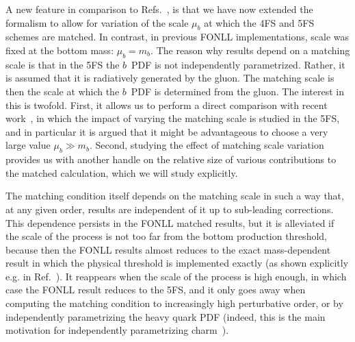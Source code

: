 \documentclass[12pt]{article}
\begin{document}
A new feature  in comparison to
Refs.~\cite{Forte:2015hba,Forte:2016sja},
is that we have now extended the formalism to allow for variation of
the scale $\mu_b$ at which the 4FS and 5FS schemes are matched.
In contrast,  in previous FONLL implementations, scale was fixed at
the  bottom mass:  $\mu_b=m_b$.
The reason why results depend on a matching scale is that in 
the 5FS the $b$~PDF is not independently
parametrized. Rather, it is assumed that it is radiatively generated
by the gluon. The matching scale is then the scale at which the $b$~PDF
is determined from the gluon. 
The interest in this is twofold. First,  it allows us
to perform  a direct comparison with recent work~\cite{Bertone:2017djs},
in which  the impact of varying the matching scale  is studied in the
5FS,  and in particular it is argued  that it might be
advantageous to choose a very large value $\mu_b\gg m_b$. 
Second, studying the effect  of matching scale variation provides us 
with another handle on the relative size of various contributions to
the matched calculation, which we will study explicitly.

The matching condition itself depends on
the matching scale in such a way that, at any given order,  results
are  independent of it up to sub-leading corrections. This dependence
persists in the FONLL matched results, but it is alleviated if the
scale of the process is  not too far from the bottom production
threshold, because then
the FONLL results almost reduces to the exact mass-dependent result in
which the physical threshold is implemented exactly (as shown
explicitly e.g. in Ref.~\cite{Forte:2010ta}). It reappears when
the scale of the process is 
high enough, in which case  the FONLL result reduces to the 5FS, and it
only goes away when computing the matching condition to increasingly
high perturbative order, or by independently parametrizing the heavy
quark PDF (indeed, this is the main motivation for independently
parametrizing charm~\cite{Ball:2016neh,Ball:2017nwa}).
\end{document}
